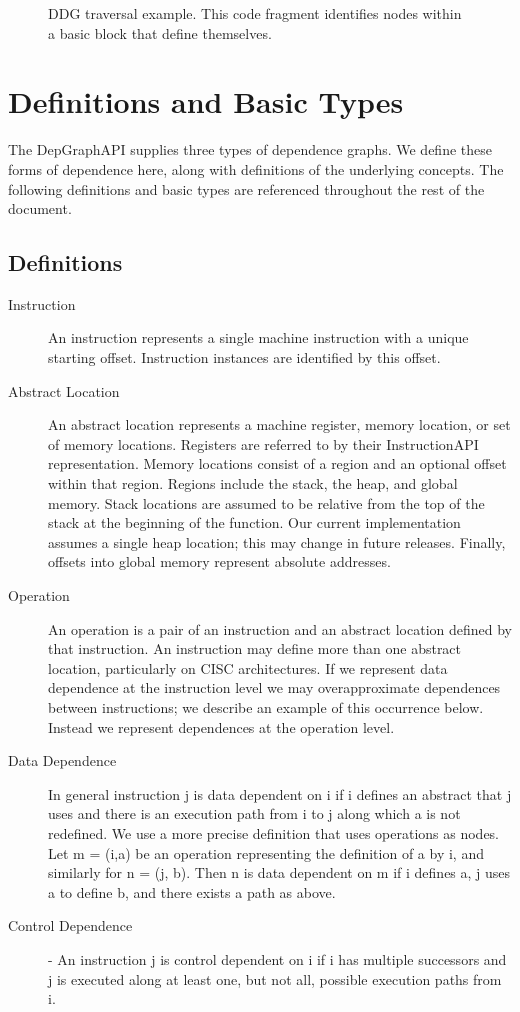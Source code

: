 \documentclass[12pt]{article}
\begin{document}
\begin{figure}\label{example2}

\caption{DDG traversal example. This code fragment identifies nodes
  within a basic block that define themselves.}
\end{figure}


\section{Definitions and Basic Types}

The DepGraphAPI supplies three types of dependence graphs. We define
these forms of dependence here, along with definitions of the
underlying concepts. The following definitions and basic types are
referenced throughout the rest of the document.

\subsection{Definitions}
\begin{description}
\item[Instruction] An instruction represents a single machine
instruction with a unique starting offset. Instruction instances are
identified by this offset.
\item[Abstract Location] An abstract location represents a machine
register, memory location, or set of memory locations. Registers are
referred to by their InstructionAPI representation. Memory locations
consist of a region and an optional offset within that region. Regions
include the stack, the heap, and global memory. Stack locations are
assumed to be relative from the top of the stack at the beginning of
the function. Our current implementation assumes a single heap
location; this may change in future releases. Finally, offsets into
global memory represent absolute addresses.
\item[Operation] An operation is a pair of an instruction and an
abstract location defined by that instruction. An instruction may
define more than one abstract location, particularly on CISC
architectures. If we represent data dependence at the instruction
level we may overapproximate dependences between instructions; we
describe an example of this occurrence below. Instead we represent
dependences at the operation level.
\item[Data Dependence] In general instruction j is data dependent on i
if i defines an abstract that j uses and there is an execution path
from i to j along which a is not redefined. We use a more precise
definition that uses operations as nodes. Let m = (i,a) be an
operation representing the definition of a by i, and similarly for n =
(j, b). Then n is data dependent on m if i defines a, j uses a to
define b, and there exists a path as above.
\item[Control Dependence] - An instruction j is control dependent on i
if i has multiple successors and j is executed along at least one, but
not all, possible execution paths from i.
\end{description}
\end{document}
